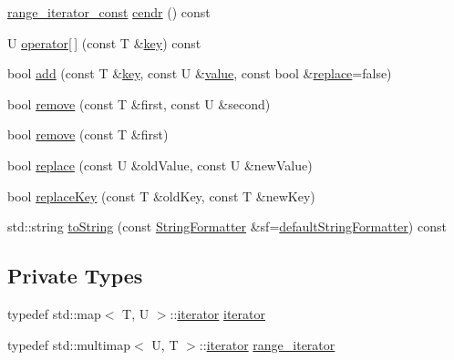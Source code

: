 \begin{DoxyCompactItemize}
\item 
\hyperlink{classMapReversable_aed8c3cc9e7a8601664db79d56d117adf}{range\+\_\+iterator\+\_\+const} \hyperlink{classMapReversable_ada3c47662db8789525f572dabe378244}{cendr} () const
\item 
U \hyperlink{classMapReversable_a71cb9601304a81fa70fff861ce25180a}{operator\mbox{[}$\,$\mbox{]}} (const T \&\hyperlink{classMapReversable_a96492535f9aa469ffd75f28620b8ead4}{key}) const
\item 
bool \hyperlink{classMapReversable_a2d4fbdc1aae7e5e53cf58c6bea63b450}{add} (const T \&\hyperlink{classMapReversable_a96492535f9aa469ffd75f28620b8ead4}{key}, const U \&\hyperlink{classMapReversable_ad4b84d263ee939c25f45a0503f3b3c21}{value}, const bool \&\hyperlink{classMapReversable_a2d70db0cb1f28dc57a7efe9da6155f63}{replace}=false)
\item 
bool \hyperlink{classMapReversable_aa4338f7c831e5a404758f88e80d13672}{remove} (const T \&first, const U \&second)
\item 
bool \hyperlink{classMapReversable_a4568cc0ec74160de575382d48b4d6636}{remove} (const T \&first)
\item 
bool \hyperlink{classMapReversable_a2d70db0cb1f28dc57a7efe9da6155f63}{replace} (const U \&old\+Value, const U \&new\+Value)
\item 
bool \hyperlink{classMapReversable_a9dd692e3862043c5cc02cfb9e003cf19}{replace\+Key} (const T \&old\+Key, const T \&new\+Key)
\item 
std\+::string \hyperlink{classMapReversable_a840df7e42bccf937f4d369e2006f3c15}{to\+String} (const \hyperlink{classStringFormatter}{String\+Formatter} \&sf=\hyperlink{stringFormatter_8h_abf1349c8e24162d0134072aff288f2a2}{default\+String\+Formatter}) const
\end{DoxyCompactItemize}
\subsection*{Private Types}
\begin{DoxyCompactItemize}
\item 
typedef std\+::map$<$ T, U $>$\+::\hyperlink{classMapReversable_af0fbc4d04214f278af7094f5db9133f3}{iterator} \hyperlink{classMapReversable_af0fbc4d04214f278af7094f5db9133f3}{iterator}
\item 
typedef std\+::multimap$<$ U, T $>$\+::\hyperlink{classMapReversable_af0fbc4d04214f278af7094f5db9133f3}{iterator} \hyperlink{classMapReversable_a1c18ca6fe9f9890e5ad63aedf3eca6d7}{range\+\_\+iterator}
\end{DoxyCompactItemize}
